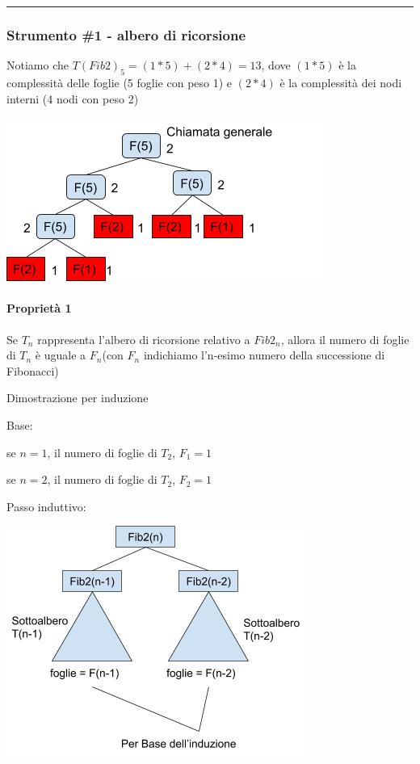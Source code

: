 \documentclass{article}
\let\oldparagraph\paragraph
\renewcommand{\paragraph}[1]{\oldparagraph{#1}\mbox{}}
\begin{document}
{{{\begin{center}\rule{0.5\linewidth}{\linethickness}\end{center}

\hypertarget{h.x4ciu865ga1f}{\subsubsection{\texorpdfstring{{Strumento
\#1 - albero di
ricorsione}}{Strumento \#1 - albero di ricorsione}}\label{h.x4ciu865ga1f}}

{Notiamo che $T(Fib2)_5=(1*5)+(2*4)=13$, dove $(1 * 5)$ è la complessità delle foglie (5 foglie con peso 1) e $(2 * 4)$ è la complessità dei nodi interni (4 nodi con peso 2)}

{\includegraphics{images/image523.png}}

\paragraph{Proprietà 1}

{Se $T_n$ rappresenta l'albero di ricorsione relativo a $Fib2_n$, allora il numero di foglie di $T_n$ è uguale a $F_n$(con $F_n$ indichiamo l'n-esimo numero della successione di Fibonacci)}

{Dimostrazione per induzione}

{Base:}

{se $n = 1$, il numero di foglie di $T_2$, $F_1=1$}

{se $n = 2$, il numero di foglie di $T_2$, $F_2=1$}

{Passo induttivo:}

{\includegraphics{images/image528.png}}

}}}
\end{document}
